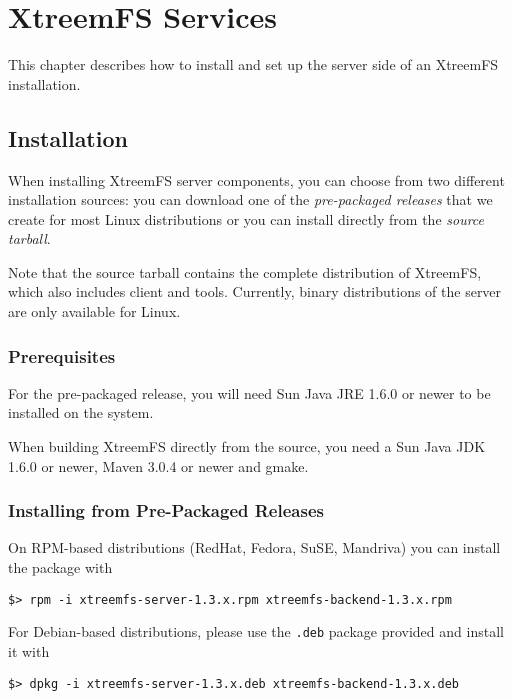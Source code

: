 \documentclass[a4paper,10pt]{book}
\begin{document}
\chapter{XtreemFS Services}

This chapter describes how to install and set up the server side of an XtreemFS installation.

\section{Installation}
\label{sec:installation}

When installing XtreemFS server components, you can choose from two different installation sources: you can download one of the \emph{pre-packaged releases} that we create for most Linux distributions or you can install directly from the \emph{source tarball}.

Note that the source tarball contains the complete distribution of XtreemFS, which also includes client and tools. Currently, binary distributions of the server are only available for Linux.

\subsection{Prerequisites}

For the pre-packaged release, you will need Sun Java JRE 1.6.0 or newer to be installed on the system.

When building XtreemFS directly from the source, you need a Sun Java JDK 1.6.0 or newer, Maven 3.0.4 or newer and gmake.

\subsection{Installing from Pre-Packaged Releases}

On RPM-based distributions (RedHat, Fedora, SuSE, Mandriva) you can install the package with

\begin{verbatim}
$> rpm -i xtreemfs-server-1.3.x.rpm xtreemfs-backend-1.3.x.rpm
\end{verbatim}


For Debian-based distributions, please use the \texttt{.deb} package provided and install it with

\begin{verbatim}
$> dpkg -i xtreemfs-server-1.3.x.deb xtreemfs-backend-1.3.x.deb
\end{verbatim}
\end{document}
